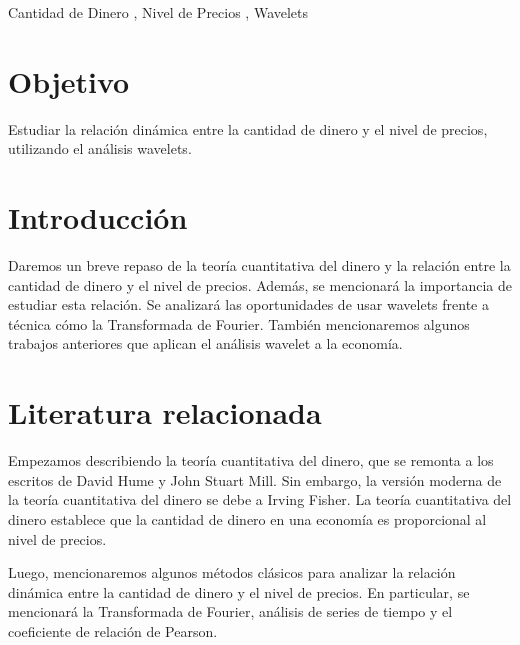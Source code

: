 \documentclass[a4paper,fleqn]{cas-sc}
\begin{document}

\begin{keywords}
    Cantidad de Dinero \sep
    Nivel de Precios \sep
    Wavelets
\end{keywords}

\maketitle


\section{Objetivo}
Estudiar la relación dinámica entre la cantidad de dinero y el nivel de precios, utilizando el análisis wavelets.


\section{Introducción}
Daremos un breve repaso de la teoría cuantitativa del dinero y la relación entre la cantidad de dinero y el nivel de precios. Además, se mencionará la importancia de estudiar esta relación. Se analizará las oportunidades de usar wavelets frente a técnica cómo la Transformada de Fourier. También mencionaremos algunos trabajos anteriores que aplican el análisis wavelet a la economía.


\section{Literatura relacionada}
Empezamos describiendo  la teoría cuantitativa del dinero, que se remonta a los escritos de David Hume y John Stuart Mill. Sin embargo, la versión moderna de la teoría cuantitativa del dinero se debe a Irving Fisher. La teoría cuantitativa del dinero establece que la cantidad de dinero en una economía es proporcional al nivel de precios.

Luego, mencionaremos algunos métodos clásicos para analizar la relación dinámica entre la cantidad de dinero y el nivel de precios. En particular, se mencionará la Transformada de Fourier, análisis de series de tiempo y el coeficiente de relación de Pearson.
\end{document}
